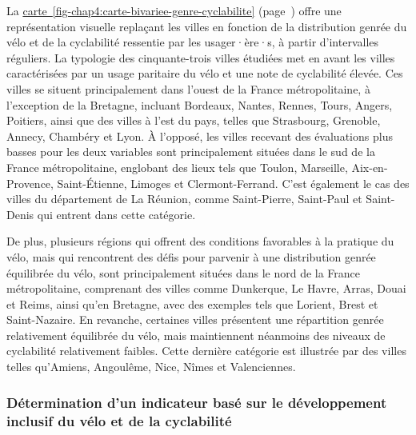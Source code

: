 \begin{refsegment}
La \hyperref[fig-chap4:carte-bivariee-genre-cyclabilite]{carte~\ref{fig-chap4:carte-bivariee-genre-cyclabilite}} (page~\pageref{fig-chap4:carte-bivariee-genre-cyclabilite}) offre une représentation visuelle replaçant les villes en fonction de la distribution genrée du vélo et de la cyclabilité ressentie par les usager·ère·s, à partir d'intervalles réguliers. La typologie des cinquante-trois villes étudiées met en avant les villes caractérisées par un usage paritaire du vélo et une note de cyclabilité élevée. Ces villes se situent principalement dans l'ouest de la France métropolitaine, à l'exception de la Bretagne, incluant Bordeaux, Nantes, Rennes, Tours, Angers, Poitiers, ainsi que des villes à l'est du pays, telles que Strasbourg, Grenoble, Annecy, Chambéry et Lyon. À l'opposé, les villes recevant des évaluations plus basses pour les deux variables sont principalement situées dans le sud de la France métropolitaine, englobant des lieux tels que Toulon, Marseille, Aix-en-Provence, Saint-Étienne, Limoges et Clermont-Ferrand. C'est également le cas des villes du département de La Réunion, comme Saint-Pierre, Saint-Paul et Saint-Denis qui entrent dans cette catégorie.%

De plus, plusieurs régions qui offrent des conditions favorables à la pratique du vélo, mais qui rencontrent des défis pour parvenir à une distribution genrée équilibrée du vélo, sont principalement situées dans le nord de la France métropolitaine, comprenant des villes comme Dunkerque, Le Havre, Arras, Douai et Reims, ainsi qu'en Bretagne, avec des exemples tels que Lorient, Brest et Saint-Nazaire. En revanche, certaines villes présentent une répartition genrée relativement équilibrée du vélo, mais maintiennent néanmoins des niveaux de cyclabilité relativement faibles. Cette dernière catégorie est illustrée par des villes telles qu'Amiens, Angoulême, Nice, Nîmes et Valenciennes.%

\subsubsection*{Détermination d'un indicateur basé sur le développement inclusif du vélo et de la cyclabilité
    \label{chap4:definition-indicateur-genre}
    }


\end{refsegment}
